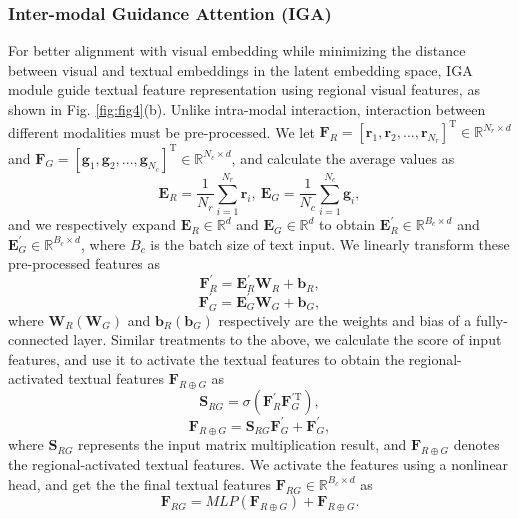 \documentclass[journal]{IEEEtran}
\begin{document}
\subsubsection{Inter-modal Guidance Attention (IGA)}
For better alignment with visual embedding while minimizing the distance between visual and textual embeddings in the latent embedding space, IGA module guide textual feature representation using regional visual features, as shown in Fig. \ref{fig:fig4}(b). Unlike intra-modal interaction, interaction between different modalities must be pre-processed. We let $\bm{F}_R = [\bm{r}_1,\bm{r}_2,...,\bm{r}_{N_r}]^{\mathrm{T}} \in \mathbb{R}^{N_r \times d}$ and $\bm{F}_G = [\bm{g}_1,\bm{g}_2,...,\bm{g}_{N_c}]^{\mathrm{T}} \in \mathbb{R}^{N_c \times d}$, and calculate the average values as
\begin{equation}
\bm{E}_R=\frac{1}{N_r} \sum_{i=1}^{N_r} \bm{r}_i , \ \bm{E}_G= \frac{1}{N_c} \sum_{i=1}^{N_c} \bm{g}_i,
\end{equation}
and we respectively expand $\bm{E}_R \in \mathbb{R}^{d}$ and $\bm{E}_G \in \mathbb{R}^{d}$ to obtain $\bm{E}_R^{\prime} \in \mathbb{R}^{B_c \times d}$ and $\bm{E}_G^{\prime} \in \mathbb{R}^{B_c \times d}$, where $B_c$ is the batch size of text input. We linearly transform these pre-processed features as
\begin{equation}
\bm{F}_R^{\prime}=\bm{E}_R^{\prime} \bm{W}_R +\bm{b}_R,
\end{equation}
\begin{equation}
\bm{F}_G^{\prime}=\bm{E}_G^{\prime} \bm{W}_G+\bm{b}_G,
\end{equation}
where $\bm{W}_R (\bm{W}_G)$ and $\bm{b}_R (\bm{b}_G)$ respectively are the weights and bias of a fully-connected layer. Similar treatments to the above, we calculate the score of input features, and use it to activate the textual features to obtain the regional-activated textual features $\bm{F}_{R \oplus G}$ as
\begin{equation}
\bm{S}_{R G} =\sigma\left(\bm{F}_R^{\prime} \bm{F}_G^{\prime \mathrm{T}}\right),
\end{equation}
\begin{equation}
\bm{F}_{R \oplus G} =\bm{S}_{R G} \bm{F}_G^{\prime}+\bm{F}_G^{\prime},
\end{equation}
where $\bm{S}_{R G}$ represents the input matrix multiplication result, and $\bm{F}_{R \oplus G}$ denotes the regional-activated textual features. We activate the features using a nonlinear head, and get the the final textual features $\bm{F}_{R G} \in \mathbb{R}^{B_c \times d}$ as
\begin{equation}
\bm{F}_{R G}=M L P\left(\bm{F}_{R \oplus G}\right)+\bm{F}_{R \oplus G}.
\end{equation}
\end{document}
